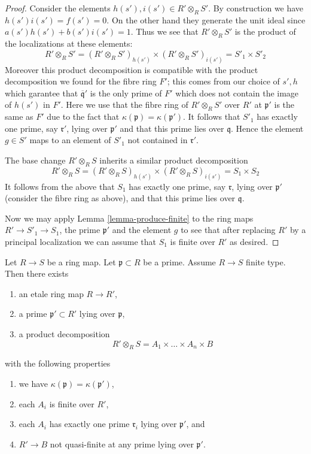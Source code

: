 \begin{proof}
\medskip\noindent
Consider the elements $h(s'), i(s') \in R' \otimes_R S'$.
By construction we have $h(s')i(s') = f(s') = 0$. On the other
hand they generate the unit ideal since $a(s')h(s') + b(s')i(s') = 1$.
Thus we see that $R' \otimes_R S'$ is the product of the
localizations at these elements:
$$
R' \otimes_R S'
=
(R' \otimes_R S')_{h(s')}
\times
(R' \otimes_R S')_{i(s')}
=
S'_1 \times S'_2
$$
Moreover this product decomposition is compatible with the product
decomposition we found for the fibre ring $F'$; this comes from our
choice of $s', h$ which garantee that $\overline{\mathfrak q}'$
is the only prime of $F'$ which does not contain the image of $h(s')$
in $F'$. Here we use that the fibre ring of $R'\otimes_R S'$ over $R'$ at
$\mathfrak p'$ is the same as $F'$ due to the fact that
$\kappa(\mathfrak p) = \kappa(\mathfrak p')$.
It follows that $S'_1$  has exactly
one prime, say $\mathfrak r'$,
lying over $\mathfrak p'$ and
that this prime lies over $\mathfrak q$.
Hence the element $g \in S'$ maps to an element of $S'_1$ not contained
in $\mathfrak r'$.

\medskip\noindent
The base change $R'\otimes_R S$ inherits a similar product decomposition
$$
R' \otimes_R S
=
(R' \otimes_R S)_{h(s')}
\times
(R' \otimes_R S)_{i(s')}
=
S_1 \times S_2
$$
It follows from the above that $S_1$ has exactly
one prime, say $\mathfrak r$,
lying over $\mathfrak p'$ (consider the fibre ring as above),
and that this prime lies over $\mathfrak q$.

\medskip\noindent
Now we may apply Lemma \ref{lemma-produce-finite} to the ring maps
$R' \to S'_1 \to S_1$, the prime $\mathfrak p'$ and
the element $g$ to see that after replacing $R'$ by
a principal localization we can assume that $S_1$ is
finite over $R'$ as desired.
\end{proof}

\begin{lemma}
\label{lemma-etale-makes-quasi-finite-finite}
Let $R \to S$ be a ring map.
Let $\mathfrak p \subset R$ be a prime.
Assume $R \to S$ finite type.
Then there exists
\begin{enumerate}
\item an etale ring map $R \to R'$,
\item a prime $\mathfrak p' \subset R'$ lying over $\mathfrak p$,
\item a product decomposition
$$
R' \otimes_R S = A_1 \times \ldots \times A_n \times B
$$
\end{enumerate}
with the following properties
\begin{enumerate}
\item we have $\kappa(\mathfrak p) = \kappa(\mathfrak p')$,
\item each $A_i$ is finite over $R'$,
\item each $A_i$ has exactly one prime $\mathfrak r_i$ lying over
$\mathfrak p'$, and
\item $R' \to B$ not quasi-finite at any prime lying over $\mathfrak p'$.
\end{enumerate}
\end{lemma}


